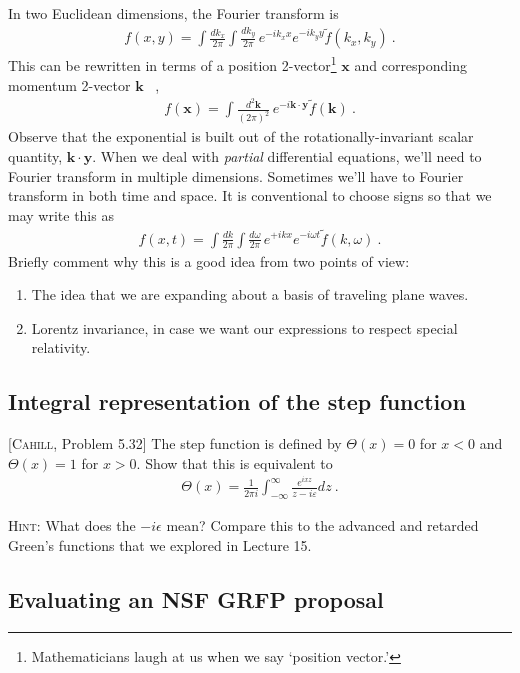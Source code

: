 \documentclass[12pt]{article}
\numberwithin{equation}{subsection}    %
\renewcommand{\tilde}{\widetilde}   %
\renewcommand{\vec}[1]{\mathbf{#1}} %
\begin{document}
In two Euclidean dimensions, the Fourier transform is
\begin{align}
	f(x, y) = \int\frac{dk_x}{2\pi} \int\frac{dk_y}{2\pi} \, e^{-ik_xx} e^{-ik_yy} \tilde f(k_x, k_y) \ .
\end{align}
This can be rewritten in terms of a position 2-vector\footnote{Mathematicians laugh at us when we say `position vector.'} $\vec{x}$ and corresponding momentum 2-vector $\vec{k}$ \ , 
\begin{align}
	f(\vec x) = \int\frac{d^2\vec k}{(2\pi)^2}  \, e^{-i\vec k\cdot \vec y} \tilde f(\vec k) \ .
\end{align}
Observe that the exponential is built out of the rotationally-invariant scalar quantity, $\vec k\cdot \vec y$. 
%
When we deal with \emph{partial} differential equations, we'll need to Fourier transform in multiple dimensions. Sometimes we'll have to Fourier transform in both time and space. It is conventional to choose signs so that we may write this as 
\begin{align}
	f(x, t) = \int\frac{dk}{2\pi} \int\frac{d\omega}{2\pi} \, e^{+ikx} e^{-i\omega t} \tilde f(k, \omega) \ .
\end{align}
Briefly comment why this is a good idea from two points of view:
\begin{enumerate}
	\item The idea that we are expanding about a basis of traveling plane waves. 
	\item Lorentz invariance, in case we want our expressions to respect special relativity.
\end{enumerate}

\subsection{Integral representation of the step function}

[\textsc{Cahill}, Problem 5.32] 
The step function is defined by $\Theta(x) = 0$ for $x<0$ and $\Theta(x) = 1$ for $x>0$. Show that this is equivalent to
\begin{align}
	\Theta(x) = \frac{1}{2\pi i}\int_{-\infty}^\infty \frac{e^{ixz}}{z-i\varepsilon} dz \ .
\end{align}

\textsc{Hint}: What does the $-i\epsilon$ mean? Compare this to the advanced and retarded Green's functions that we explored in Lecture 15. 


\subsection{Evaluating an NSF GRFP proposal}
\end{document}
